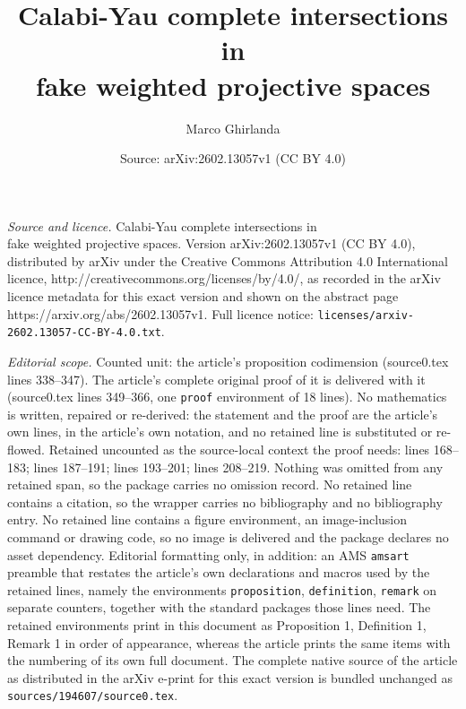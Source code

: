 \documentclass[10pt,a4paper]{amsart}
\title{Calabi-Yau complete intersections in \\ fake weighted projective spaces}
\author{Marco Ghirlanda}
\date{Source: arXiv:2602.13057v1 (CC BY 4.0)}
\begin{document}
\maketitle

\noindent\emph{Source and licence.} Calabi-Yau complete intersections in \\ fake weighted projective spaces. Version arXiv:2602.13057v1 (CC BY 4.0), distributed by arXiv under the Creative Commons Attribution 4.0 International licence, http://creativecommons.org/licenses/by/4.0/, as recorded in the arXiv licence metadata for this exact version and shown on the abstract page https://arxiv.org/abs/2602.13057v1. Full licence notice: \texttt{licenses/arxiv-2602.13057-CC-BY-4.0.txt}.\par\smallskip

\noindent\textit{Editorial scope.} Counted unit: the article's proposition codimension (source0.tex lines 338--347). The article's complete original proof of it is delivered with it (source0.tex lines 349--366, one \texttt{proof} environment of 18 lines). No mathematics is written, repaired or re-derived: the statement and the proof are the article's own lines, in the article's own notation, and no retained line is substituted or re-flowed.  Retained uncounted as the source-local context the proof needs: lines 168--183; lines 187--191; lines 193--201; lines 208--219.  Nothing was omitted from any retained span, so the package carries no omission record.  No retained line contains a citation, so the wrapper carries no bibliography and no bibliography entry.  No retained line contains a figure environment, an image-inclusion command or drawing code, so no image is delivered and the package declares no asset dependency.  Editorial formatting only, in addition: an AMS \texttt{amsart} preamble that restates the article's own declarations and macros used by the retained lines, namely the environments \texttt{proposition}, \texttt{definition}, \texttt{remark} on separate counters, together with the standard packages those lines need.  The retained environments print in this document as Proposition 1, Definition 1, Remark 1 in order of appearance, whereas the article prints the same items with the numbering of its own full document.  The complete native source of the article as distributed in the arXiv e-print for this exact version is bundled unchanged as \texttt{sources/194607/source0.tex}.
\end{document}
